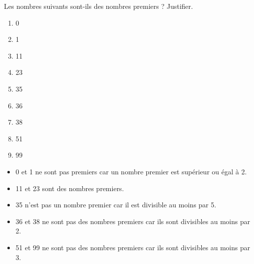 \begin{exercice*}
   Les nombres suivants sont-ils des nombres premiers ? Justifier.
   \begin{multicols}{3}
      \begin{enumerate}
         \item 0 
         \item 1 
         \item 11
         \item 23
         \item 35
         \item 36 
         \item 38 
         \item 51 
         \item 99
      \end{enumerate}
   \end{multicols}
\end{exercice*}
\begin{corrige}
   \begin{itemize}
      \item {\color{red} 0 et 1} ne sont pas premiers car un nombre premier est supérieur ou égal à 2. 
      \item {\color{red} 11 et 23} sont des nombres premiers.
      \item {\color{red} 35} n'est pas un nombre premier car il est divisible au moins par 5.
      \item {\color{red} 36 et 38} ne sont pas des nombres premiers car ils sont divisibles au moins par 2.
      \item {\color{red} 51 et 99} ne sont pas des nombres premiers car ils sont divisibles au moins par 3.
   \end{itemize}
\end{corrige}
